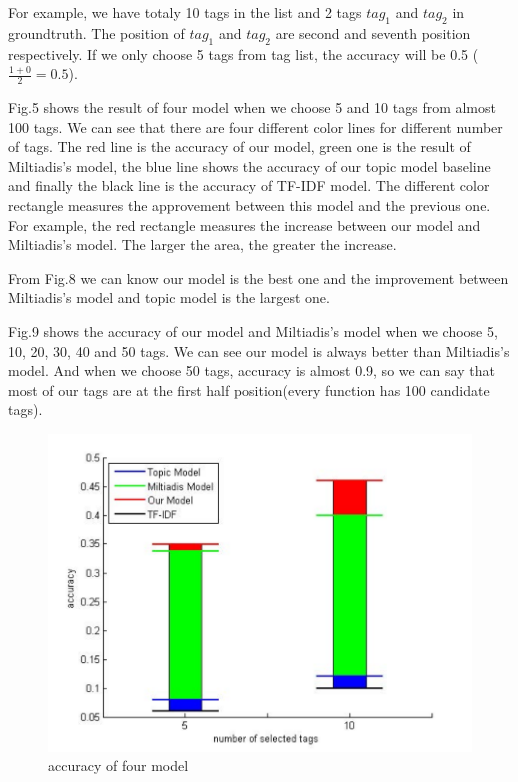 For example, we have totaly 10 tags in the list and 2 tags $tag_{1}$ and $tag_{2}$ in groundtruth. The position of $tag_{1}$ and $tag_{2}$ are second and seventh position respectively. If we only choose 5 tags from tag list, the accuracy will be 0.5 ($\frac{1+0}{2}=0.5$).

Fig.5 shows the result of four model when we choose 5 and 10 tags from almost 100 tags. We can see that there are four different color lines for different number of tags. The red line is the accuracy of our model, green one is the result of Miltiadis's model, the blue line shows the accuracy of our topic model baseline and finally the black line is the accuracy of TF-IDF model. The different color rectangle measures the approvement between this model and the previous one. For example, the red rectangle measures the increase between our model and Miltiadis's model. The larger the area, the greater the increase.

From Fig.8 we can know our model is the best one and the improvement between Miltiadis's model and topic model is the largest one.

Fig.9 shows the accuracy of our model and Miltiadis's model when we choose 5, 10, 20, 30, 40 and 50 tags. We can see our model is always better than Miltiadis's model. And when we choose 50 tags, accuracy is almost 0.9, so we can say that most of our tags are at the first half position(every function has 100 candidate tags).
\begin{figure}[!htp]
 \centering
 \includegraphics[width=\linewidth]{img/accuracy1.pdf}
 \caption{accuracy of four model}
\end{figure}

